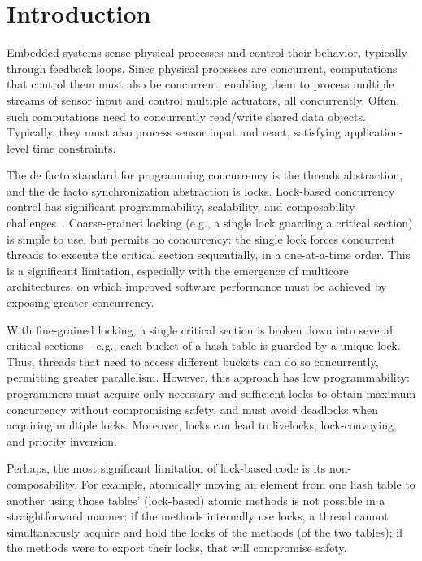 \documentclass[12pt,english]{report}
\begin{document}
\thispagestyle{empty}



\pagestyle{myheadings}

\chapter{Introduction}

Embedded systems sense physical processes and control their behavior, typically through feedback loops. Since physical processes are concurrent, computations that control them must also be concurrent, enabling them to process multiple streams of sensor input and control multiple actuators, all concurrently. Often, such computations need to concurrently read/write shared data objects. Typically, they must also process sensor input and react, satisfying application-level time constraints. 

The de facto standard for programming concurrency is the threads abstraction, and the de facto synchronization abstraction is locks. Lock-based concurrency control has significant programmability, scalability, and composability challenges~\cite{Herlihy:2006:AMP:1146381.1146382}. Coarse-grained locking (e.g., a single lock guarding a critical section) is simple to use, but permits no concurrency: the single lock forces concurrent threads to execute the critical section sequentially, in a one-at-a-time order. This is a significant limitation, especially with the emergence of multicore architectures, on which improved software performance must be achieved by exposing greater concurrency.  

With fine-grained locking, a single critical section is broken down into several critical sections -- e.g., each bucket of a hash table is guarded by a unique lock. Thus, threads that need to access different buckets can do so concurrently, permitting greater parallelism. However, this approach has low programmability: programmers must acquire only necessary and sufficient locks to obtain maximum concurrency without compromising safety, and must avoid deadlocks when acquiring multiple locks. Moreover, locks can lead to livelocks, lock-convoying, and priority inversion. 

Perhaps, the most significant limitation of lock-based code is its non-composability. For example, atomically moving an element from one hash table to another using those tables' (lock-based) atomic methods is not possible in a straightforward manner: if the methods internally use locks, a thread cannot simultaneously acquire and hold the locks of the methods (of the two tables); if the methods were to export their locks, that will compromise safety. 
\end{document}
